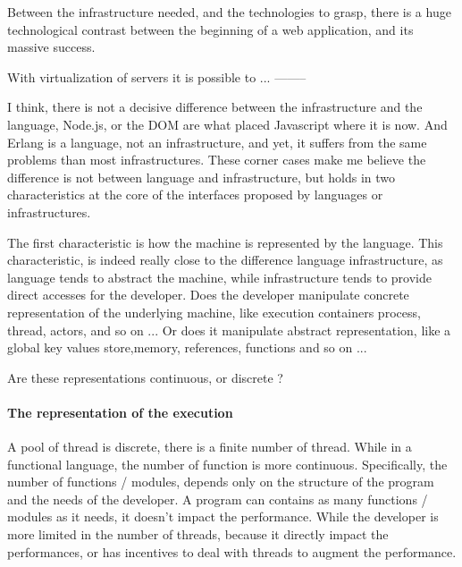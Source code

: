 Between the infrastructure needed, and the technologies to grasp, there is a huge technological contrast between the beginning of a web application, and its massive success.

With virtualization of servers it is possible to ...
--------










I think, there is not a decisive difference between the infrastructure and the language, Node.js, or the DOM are what placed Javascript where it is now.
And Erlang is a language, not an infrastructure, and yet, it suffers from the same problems than most infrastructures.
These corner cases make me believe the difference is not between language and infrastructure, but holds in two characteristics at the core of the interfaces proposed by languages or infrastructures.

The first characteristic is how the machine is represented by the language.
This characteristic, is indeed really close to the difference language infrastructure, as language tends to abstract the machine, while infrastructure tends to provide direct accesses for the developer.
Does the developer manipulate concrete representation of the underlying machine, like execution containers process, thread, actors, and so on ...
Or does it manipulate abstract representation, like a global key values store,memory, references, functions and so on ...

Are these representations continuous, or discrete ?

\paragraph{The representation of the execution}
A pool of thread is discrete, there is a finite number of thread.
While in a functional language, the number of function is more continuous.
Specifically, the number of functions / modules, depends only on the structure of the program and the needs of the developer.
A program can contains as many functions / modules as it needs, it doesn't impact the performance.
While the developer is more limited in the number of threads, because it directly impact the performances, or has incentives to deal with threads to augment the performance.

